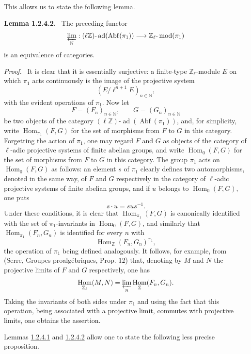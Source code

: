 \documentclass[11pt]{article}
\newenvironment{statement}[1]{\par\medskip\noindent\textbf{#1.}\ }{\par\medskip}
\newenvironment{prooftext}[1][Proof]{\par\noindent\emph{#1.}\ }{\par\medskip}
\DeclareMathOperator{\Hom}{Hom}
\providecommand{\Hom}{\operatorname{Hom}}
\providecommand{\Abf}{\operatorname{Abf}}
\providecommand{\ad}{\operatorname{ad}}
\providecommand{\modn}{\operatorname{mod}}
\providecommand{\Hom}{\operatorname{Hom}}
\begin{document}
This allows us to state the following lemma.

\label{sga5:VI:lemma:1.2.4.2}\begin{statement}{Lemma 1.2.4.2}
The preceding functor
\[
\varprojlim_{\mathbb N}:(\ell\mathbb Z)\text{-}\ad(\Abf(\pi_1))
\longrightarrow \mathbb Z_\ell\text{-}\modn(\pi_1)
\]
is an equivalence of categories.
\end{statement}

\begin{prooftext}[Proof]
It is clear that it is essentially surjective: a finite-type \(\mathbb Z_\ell\)-module \(E\) on which \(\pi_1\) acts continuously is the image of the projective system
\[
(E/\ell^{n+1}E)_{n\in\mathbb N},
\]
with the evident operations of \(\pi_1\). Now let
\[
F=(F_n)_{n\in\mathbb N},\qquad G=(G_n)_{n\in\mathbb N}
\]
be two objects of the category \((\ell\mathbb Z)\text{-}\ad(\Abf(\pi_1))\), and, for simplicity, write \(\Hom_{\pi_1}(F,G)\) for the set of morphisms from \(F\) to \(G\) in this category. Forgetting the action of \(\pi_1\), one may regard \(F\) and \(G\) as objects of the category of \(\ell\)-adic projective systems of finite abelian groups, and write \(\Hom_0(F,G)\) for the set of morphisms from \(F\) to \(G\) in this category. The group \(\pi_1\) acts on \(\Hom_0(F,G)\) as follows: an element \(s\) of \(\pi_1\) clearly defines two automorphisms, denoted in the same way, of \(F\) and \(G\) respectively in the category of \(\ell\)-adic projective systems of finite abelian groups, and if \(u\) belongs to \(\Hom_0(F,G)\), one puts
\[
s\cdot u=sus^{-1}.
\]
Under these conditions, it is clear that \(\Hom_{\pi_1}(F,G)\) is canonically identified with the set of \(\pi_1\)-invariants in \(\Hom_0(F,G)\), and similarly that \(\Hom_{\pi_1}(F_n,G_n)\) is identified for every \(n\) with
\[
\Hom_{\mathbb Z}(F_n,G_n)^{\pi_1},
\]
the operation of \(\pi_1\) being defined analogously. It follows, for example, from (Serre, Groupes proalgébriques, Prop. 12) that, denoting by \(M\) and \(N\) the projective limits of \(F\) and \(G\) respectively, one has
\[
\Hom_{\mathbb Z_\ell}(M,N)=\varprojlim_n\Hom_{\mathbb Z}(F_n,G_n).
\]
Taking the invariants of both sides under \(\pi_1\) and using the fact that this operation, being associated with a projective limit, commutes with projective limits, one obtains the assertion.
\end{prooftext}

Lemmas \hyperref[sga5:VI:lemma:1.2.4.1]{1.2.4.1} and \hyperref[sga5:VI:lemma:1.2.4.2]{1.2.4.2} allow one to state the following less precise proposition.
\end{document}
